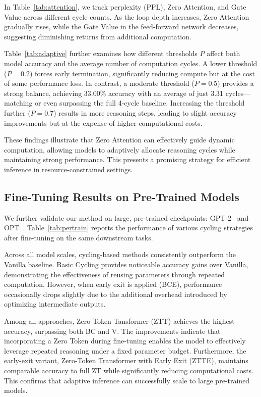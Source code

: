 In Table~\ref{tab:attention}, we track perplexity ({PPL}), Zero Attention, and Gate Value across different cycle counts. As the loop depth increases, {Zero Attention} gradually rises, while the {Gate Value} in the feed-forward network decreases, suggesting diminishing returns from additional computation.

Table~\ref{tab:adaptive} further examines how different thresholds \( P \) affect both model accuracy and the average number of computation cycles. A lower threshold (\( P = 0.2 \)) forces early termination, significantly reducing compute but at the cost of some performance loss. In contrast, a moderate threshold (\( P = 0.5 \)) provides a strong balance, achieving 33.00\% accuracy with an average of just 3.31 cycles—matching or even surpassing the full 4-cycle baseline. Increasing the threshold further (\( P = 0.7 \)) results in more reasoning steps, leading to slight accuracy improvements but at the expense of higher computational costs.

These findings illustrate that Zero Attention can effectively guide {dynamic computation}, allowing models to adaptively allocate reasoning cycles while maintaining strong performance. This presents a promising strategy for efficient inference in resource-constrained settings.




\subsection{Fine-Tuning Results on Pre-Trained Models}
\label{sec:exp_pretrained}



We further validate our method on large, pre-trained checkpoints: GPT-2~\cite{radford2019language} and  OPT~\cite{zhang2023opt}. Table~\ref{tab:pertrain} reports the performance of various cycling strategies after fine-tuning on the same downstream tasks.

Across all model scales, {cycling-based methods} consistently outperform the {Vanilla } baseline. Basic Cycling  provides noticeable accuracy gains over Vanilla, demonstrating the effectiveness of reusing parameters through repeated computation. However, when early exit is applied ({BCE}), performance occasionally drops slightly due to the additional overhead introduced by optimizing intermediate outputs.

Among all approaches, {Zero-Token Tansformer (ZTT)} achieves the highest accuracy, surpassing both BC and V. The improvements indicate that incorporating a Zero Token during fine-tuning enables the model to effectively leverage repeated reasoning under a fixed parameter budget. Furthermore, the early-exit variant, {Zero-Token Transformer with Early Exit (ZTTE)}, maintains comparable accuracy to full ZT while significantly reducing computational costs. This confirms that adaptive inference can successfully scale to large pre-trained models.

